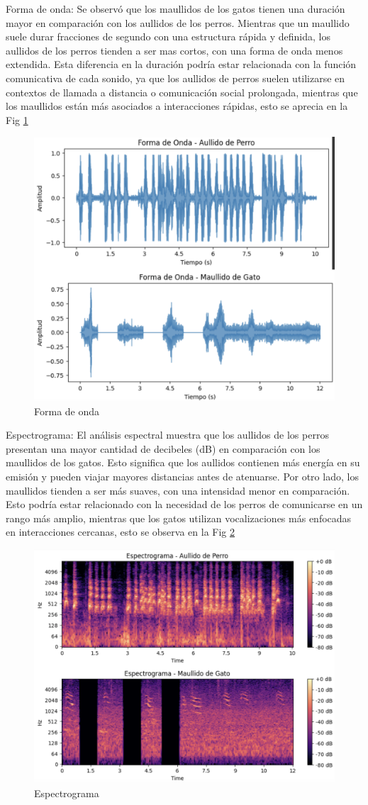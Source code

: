 \documentclass[journal]{IEEEtran}
\begin{document}
Forma de onda: Se observó que los maullidos de los gatos tienen una duración mayor en comparación con los aullidos de los perros. Mientras que un maullido suele durar fracciones de segundo con una estructura rápida y definida, los aullidos de los perros tienden a ser mas cortos, con una forma de onda menos extendida. Esta diferencia en la duración podría estar relacionada con la función comunicativa de cada sonido, ya que los aullidos de perros suelen utilizarse en contextos de llamada a distancia o comunicación social prolongada, mientras que los maullidos están más asociados a interacciones rápidas, esto se aprecia en la Fig \ref{fig:forma de onda}
\begin{figure}
    \centering
    \includegraphics[width=0.5\linewidth]{Figs/Forma de onda.png}
    \caption{Forma de onda}
    \label{fig:forma de onda}
\end{figure}

Espectrograma: El análisis espectral muestra que los aullidos de los perros presentan una mayor cantidad de decibeles (dB) en comparación con los maullidos de los gatos. Esto significa que los aullidos contienen más energía en su emisión y pueden viajar mayores distancias antes de atenuarse. Por otro lado, los maullidos tienden a ser más suaves, con una intensidad menor en comparación. Esto podría estar relacionado con la necesidad de los perros de comunicarse en un rango más amplio, mientras que los gatos utilizan vocalizaciones más enfocadas en interacciones cercanas, esto se observa en la Fig \ref{fig:espectro}

\begin{figure}
    \centering
    \includegraphics[width=0.5\linewidth]{Figs/Espectro.png}
    \caption{Espectrograma}
    \label{fig:espectro}
\end{figure}
\end{document}
